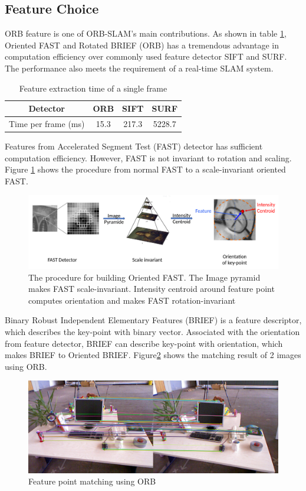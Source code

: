 \documentclass[letterpaper, 10 pt, conference]{ieeeconf}  %
\begin{document}
\subsection{Feature Choice}
ORB feature is one of ORB-SLAM's main contributions. As shown in table \ref{feature_extraction_time}, Oriented FAST and Rotated BRIEF (ORB) has a tremendous advantage in computation efficiency over commonly used feature detector SIFT and SURF. The performance also meets the requirement of a real-time SLAM system.
%
\begin{table}[h!]
\caption{Feature extraction time of a single frame}
\label{feature_extraction_time}
\centering
\begin{tabular}{ c c c c } 
 \hline
 \hline
 Detector & ORB & SIFT & SURF \\ 
 \hline
 Time per frame (ms)& 15.3 & 217.3 & 5228.7\\ 
 \hline
 \hline
\end{tabular}
\end{table}
%

Features from Accelerated Segment Test (FAST) detector has sufficient computation efficiency. However, FAST is not invariant to rotation and scaling. Figure \ref{oriented_fast} shows the procedure from normal FAST to a scale-invariant oriented FAST. 
%
\begin{figure}[!htbp]%
\centering
\includegraphics[scale=0.14]{./images/Oriented_FAST}
\caption{The procedure for building Oriented FAST. The Image pyramid makes FAST scale-invariant. Intensity centroid around feature point computes orientation and makes FAST rotation-invariant}
\label{oriented_fast}
\end{figure}
%

Binary Robust Independent Elementary Features (BRIEF) is a feature descriptor, which describes the key-point with binary vector. Associated with the orientation from feature detector, BRIEF can describe key-point with orientation, which makes BRIEF to Oriented BRIEF. Figure\ref{point_correspondence} shows the matching result of 2 images using ORB.

%
\begin{figure}[!htbp]%
\centering
\includegraphics[scale=0.17]{./images/Point_correspondence}
\caption{Feature point matching using ORB}
\label{point_correspondence}
\end{figure}
%
\end{document}
